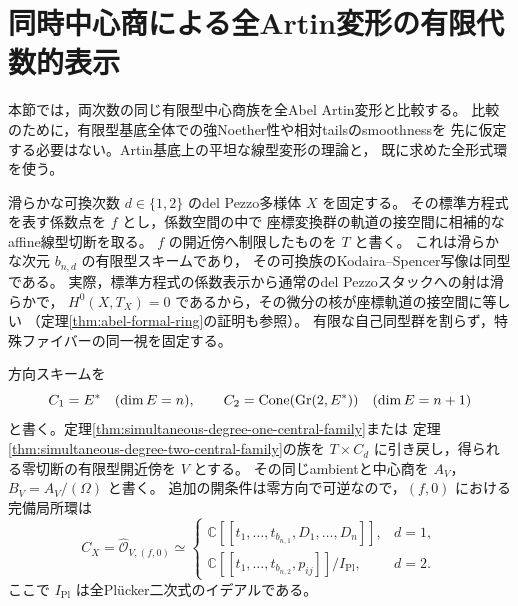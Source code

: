 \section{同時中心商による全Artin変形の有限代数的表示}
\label{sec:simultaneous-formal-comparison}

本節では，両次数の同じ有限型中心商族を全Abel Artin変形と比較する。
比較のために，有限型基底全体での強Noether性や相対tailsのsmoothnessを
先に仮定する必要はない。Artin基底上の平坦な線型変形の理論と，
既に求めた全形式環を使う。

滑らかな可換次数 $d\in\{1,2\}$ のdel Pezzo多様体 $X$ を固定する。
その標準方程式を表す係数点を $f$ とし，係数空間の中で
座標変換群の軌道の接空間に相補的なaffine線型切断を取る。
$f$ の開近傍へ制限したものを $T$ と書く。
これは滑らかな次元 $b_{n,d}$ の有限型スキームであり，
その可換族のKodaira--Spencer写像は同型である。
実際，標準方程式の係数表示から通常のdel Pezzoスタックへの射は滑らかで，
$H^0(X,T_X)=0$ であるから，その微分の核が座標軌道の接空間に等しい
\cite[定理7.3，定理8.8]{PoissonDP}
（定理\ref{thm:abel-formal-ring}の証明も参照）。
有限な自己同型群を割らず，特殊ファイバーの同一視を固定する。

方向スキームを
\[
 C_1=E^*\quad(\dim E=n),\qquad
 C_2=\operatorname{Cone}(\operatorname{Gr}(2,E^*))\quad(\dim E=n+1)
\]
と書く。定理\ref{thm:simultaneous-degree-one-central-family}または
定理\ref{thm:simultaneous-degree-two-central-family}の族を
$T\times C_d$ に引き戻し，得られる零切断の有限型開近傍を $V$ とする。
その同じambientと中心商を $A_V$，$B_V=A_V/(\Omega)$ と書く。
追加の開条件は零方向で可逆なので，$(f,0)$ における完備局所環は
\begin{equation}\label{eq:simultaneous-family-formal-ring}
 C_X=\widehat{\mathcal O}_{V,(f,0)}\simeq
 \begin{cases}
  \mathbb C[[t_1,\ldots,t_{b_{n,1}},D_1,\ldots,D_n]],&d=1,\\[2pt]
  \mathbb C[[t_1,\ldots,t_{b_{n,2}},p_{ij}]]/I_{\mathrm{Pl}},&d=2.
 \end{cases}
\end{equation}
ここで $I_{\mathrm{Pl}}$ は全Pl\"ucker二次式のイデアルである。

